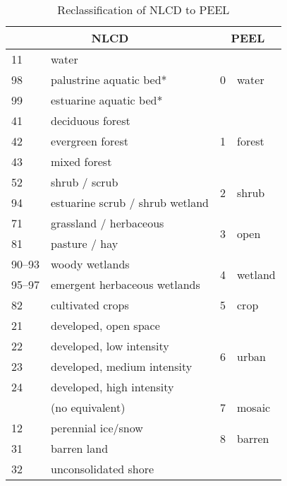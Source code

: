 \begin{center}
  \begin{table}[htbp]
    \begin{tabular}{|l|l|l|l|}
      \hline
      \multicolumn{2}{|c|}{NLCD} & \multicolumn{2}{|c|}{PEEL} \\
      \hline
      11 & water & \multirow{3}{*}{0} & \multirow{3}{*}{water} \\
      98 & palustrine aquatic bed* & & \\
      99 & estuarine aquatic bed* & & \\
      \hline
      41 & deciduous forest & \multirow{3}{*}{1} & \multirow{3}{*}{forest} \\
      42 & evergreen forest & & \\
      43 & mixed forest & & \\
      \hline
      52 & shrub / scrub & \multirow{2}{*}{2} & \multirow{2}{*}{shrub} \\
      94 & estuarine scrub / shrub wetland & & \\
      \hline
      71 & grassland / herbaceous & \multirow{2}{*}{3} & \multirow{2}{*}{open} \\
      81 & pasture / hay & & \\
      \hline
      90--93 & woody wetlands & \multirow{2}{*}{4} & \multirow{2}{*}{wetland} \\
      95--97 & emergent herbaceous wetlands & & \\
      \hline
      82 & cultivated crops & 5 & crop \\
      \hline
      21 & developed, open space & \multirow{4}{*}{6} & \multirow{4}{*}{urban} \\
      22 & developed, low intensity & & \\
      23 & developed, medium intensity & & \\
      24 & developed, high intensity & & \\
      \hline
       & (no equivalent) & 7 & mosaic \\
      \hline
      12 & perennial ice/snow & \multirow{2}{*}{8} & \multirow{2}{*}{barren} \\
      31 & barren land & & \\  
      32 & unconsolidated shore & & \\  
      \hline
    \end{tabular}
    \caption{Reclassification of NLCD to PEEL}
    \label{tab:mlct_reclass}
  \end{table}
\end{center}


